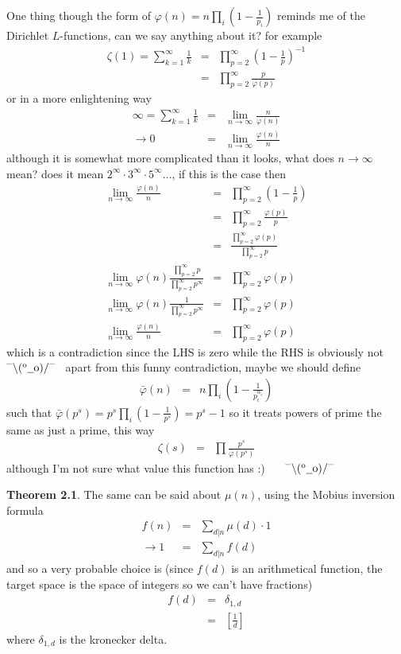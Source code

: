 \documentclass[aps,preprint,preprintnumbers,nofootinbib,showpacs,prd]{revtex4-1}
\newcommand{\nbea}{\begin{eqnarray*}}
\newcommand{\neea}{\end{eqnarray*}}
\newcommand{\dunno}{$ {}^{\mbox {--}}\backslash(^{\rm o}{}\underline{\hspace{0.2cm}}{\rm o})/^{\mbox {--}}$}
\begin{document}
One thing though the form of $\varphi(n) = n\prod_i\left(1 - \frac{1}{p_i}\right)$ reminds me of the Dirichlet $L$-functions, can we say anything about it? for example
%
\nbea
\zeta(1) = \sum_{k=1}^\infty \frac{1}{k} & = & \prod_{p=2}^\infty\left(1-\frac{1}{p}\right)^{-1} \\
& = & \prod_{p=2}^\infty \frac{p}{\varphi(p)}
\neea
%
or in a more enlightening way
%
\nbea
\infty = \sum_{k=1}^\infty \frac{1}{k} & = & \lim_{n\to\infty} \frac{n}{\varphi(n)} \\
\to 0 & = & \lim_{n\to\infty}\frac{\varphi(n)}{n}
\neea
%
although it is somewhat more complicated than it looks, what does $n\to\infty$ mean? does it mean $2^\infty\cdot 3^\infty\cdot 5^\infty\ldots$, if this is the case then
%
\nbea
\lim_{n\to\infty}\frac{\varphi(n)}{n} & = & \prod_{p=2}^\infty \left(1-\frac{1}{p}\right) \\
& = & \prod_{p=2}^\infty \frac{\varphi(p)}{p} \\
& = & \frac{\prod_{p=2}^\infty \varphi(p)}{\prod_{p=2}^\infty p} \\
\lim_{n\to\infty} \varphi(n) \frac{\prod_{p=2}^\infty p}{\prod_{p=2}^\infty p^\infty} & = & \prod_{p=2}^\infty \varphi(p) \\
\lim_{n\to\infty} \varphi(n) \frac{1}{\prod_{p=2}^\infty p^\infty} & = & \prod_{p=2}^\infty \varphi(p) \\
\lim_{n\to\infty}\frac{\varphi(n)}{n} & = & \prod_{p=2}^\infty \varphi(p)
\neea
%
which is a contradiction since the LHS is zero while the RHS is obviously not ~\dunno~ apart from this funny contradiction, maybe we should define
%
\nbea
\bar\varphi(n) & = & n\prod_i\left(1-\frac{1}{p_i^{\alpha_i}}\right)
\neea
%
such that $\bar\varphi(p^s) =p^s\prod_i\left(1-\frac{1}{p^{s}}\right) = p^s-1$ so it treats powers of prime the same as just a prime, this way
%
\nbea
\zeta(s) & = & \prod \frac{p^s}{\bar\varphi(p^s)}
\neea
%
although I'm not sure what value this function has :) ~~~\dunno




{\bf Theorem 2.1}. The same can be said about $\mu(n)$, using the Mobius inversion formula
%
\nbea
f(n) & = & \sum_{d|n}\mu(d) \cdot 1 \\
\to 1 & = & \sum_{d|n} f(d)
\neea
%
and so a very probable choice is (since $f(d)$ is an arithmetical function, the target space is the space of integers so we can't have fractions)
%
\nbea
f(d) & = & \delta_{1,d} \\
& = & \left\lbrack \frac{1}{d} \right\rbrack
\neea
%
where $\delta_{1,d}$ is the kronecker delta.
\end{document}
